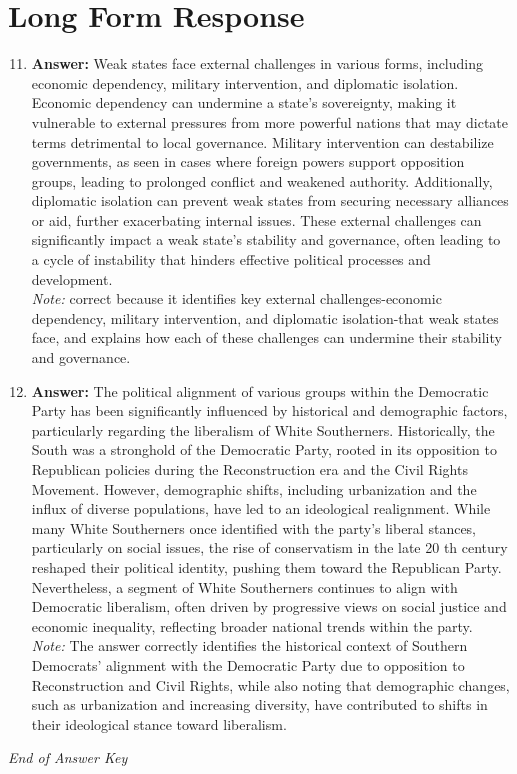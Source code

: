 \documentclass[12pt]{article}
\begin{document}
\section*{Long Form Response}
\begin{enumerate}[label=\arabic*.]
\setcounter{enumi}{10}
\item \textbf{Answer:} Weak states face external challenges in various forms, including economic dependency, military intervention, and diplomatic isolation. Economic dependency can undermine a state's sovereignty, making it vulnerable to external pressures from more powerful nations that may dictate terms detrimental to local governance. Military intervention can destabilize governments, as seen in cases where foreign powers support opposition groups, leading to prolonged conflict and weakened authority. Additionally, diplomatic isolation can prevent weak states from securing necessary alliances or aid, further exacerbating internal issues. These external challenges can significantly impact a weak state's stability and governance, often leading to a cycle of instability that hinders effective political processes and development.
\\ \textit{Note:} correct because it identifies key external challenges-economic dependency, military intervention, and diplomatic isolation-that weak states face, and explains how each of these challenges can undermine their stability and governance.
\item \textbf{Answer:} The political alignment of various groups within the Democratic Party has been significantly influenced by historical and demographic factors, particularly regarding the liberalism of White Southerners. Historically, the South was a stronghold of the Democratic Party, rooted in its opposition to Republican policies during the Reconstruction era and the Civil Rights Movement. However, demographic shifts, including urbanization and the influx of diverse populations, have led to an ideological realignment. While many White Southerners once identified with the party's liberal stances, particularly on social issues, the rise of conservatism in the late 20 th century reshaped their political identity, pushing them toward the Republican Party. Nevertheless, a segment of White Southerners continues to align with Democratic liberalism, often driven by progressive views on social justice and economic inequality, reflecting broader national trends within the party.
\\ \textit{Note:} The answer correctly identifies the historical context of Southern Democrats' alignment with the Democratic Party due to opposition to Reconstruction and Civil Rights, while also noting that demographic changes, such as urbanization and increasing diversity, have contributed to shifts in their ideological stance toward liberalism.
\end{enumerate}

\vfill
\noindent\textit{End of Answer Key}
\end{document}
